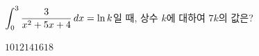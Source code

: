 $\displaystyle\int_{0}^{3}\dfrac{3}{x^2+5x+4}\mkern3mu dx=\ln k$일 때, 상수 $k$에 대하여 $7k$의 값은?
\begin{choices32}{$10$}{$12$}{$14$}{$16$}{$18$}\end{choices32}
